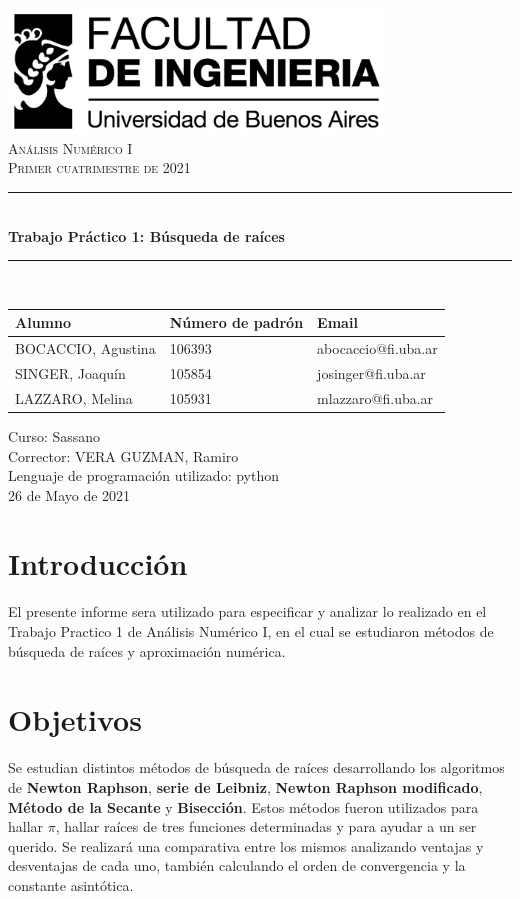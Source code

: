 \documentclass[titlepage,a4paper]{article}
\newcommand{\HRule}{\rule{\linewidth}{0.5mm}}
\begin{document}
\begin{titlepage} %
	\includegraphics[width=0.75\textwidth]{logofiuba.jpg}\\[4cm] 
    \centering
    \textsc{\LARGE Análisis Numérico I}\\[0.5cm]
    \textsc{\Large Primer cuatrimestre de 2021 }\\[0.5cm]  
    \HRule \\[0.4cm]
    {\huge \bfseries Trabajo Práctico 1: Búsqueda de raíces}\\[0.3cm]
    \HRule \\[2cm]
  	\Large
  	\begin{tabular}{ | l | l | l | }
  	    \hline
  	     Alumno & Número de padrón & Email \\ \hline
  	     BOCACCIO, Agustina & 106393 & abocaccio@fi.uba.ar \\
  	     SINGER, Joaquín & 105854 & josinger@fi.uba.ar \\
  	     LAZZARO, Melina & 105931 & mlazzaro@fi.uba.ar\\
  	     \hline
  	\end{tabular}
  	\vfill
            {\Large Curso: Sassano}\\
            {\Large Corrector: VERA GUZMAN, Ramiro}\\
            {\Large Lenguaje de programación utilizado: python}\\
  	\vfill
  	{\large 26 de Mayo de 2021}
\end{titlepage}

\tableofcontents %
\newpage
\section{Introducción}
El presente informe sera utilizado para especificar y analizar lo realizado en el Trabajo Practico 1 de Análisis Numérico I, en el cual se estudiaron métodos de búsqueda de raíces y aproximación numérica.

\section{Objetivos}
Se estudian distintos métodos de búsqueda de raíces desarrollando los algoritmos de \textbf{Newton Raphson}, \textbf{serie de Leibniz}, \textbf{Newton Raphson modificado}, \textbf{Método de la Secante} y \textbf{Bisección}. Estos métodos fueron utilizados para hallar $\pi$, hallar raíces de tres funciones determinadas y para ayudar a un ser querido. Se realizará una comparativa entre los mismos analizando ventajas y desventajas de cada uno, también calculando el orden de convergencia y la constante asintótica.
\end{document}
